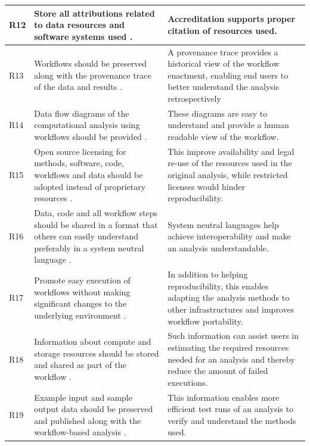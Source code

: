 \documentclass[a4paper,num-refs]{oup-contemporary}
\begin{document}
\begin{table}[!htbp]
\begin{tabularx}{\linewidth}{p{1.4cm} L L}
R12 \newline{} & Store all attributions related to data resources and software systems used \citep{garijo_2017, Stodden2014}. & Accreditation supports proper citation of resources used.  \\  \midrule
R13 \newline{} & Workflows should be preserved along with the provenance trace of the data and results \citep{belhajjame_2015, belhajjame_2012, garijo_2017, sandve_2013, Stodden2014}. &   A provenance trace provides a historical view of the workflow enactment, enabling end users to better understand the analysis retrospectively  \\  \midrule
R14 \newline{} & Data flow diagrams of the computational analysis using workflows should be provided \citep{kanwal_2017, garijo_2013}. &  These diagrams are easy to understand and provide a human readable view of the workflow.   \\  \midrule
R15 \newline{} & Open source licensing for methods, software, code, workflows and data should be adopted instead of proprietary resources \citep{kanwal_2017, garijo_2013, sandve_2013, stodden_2016, Stodden2014, Gymrek2016}. & This improve availability and legal re-use of the resources used in the original analysis, while restricted licenses would hinder reproducibility. \\  \midrule
R16 \newline{} & Data, code and all workflow steps should be shared in a format that others can easily understand preferably in a system neutral language \citep{belhajjame_2015, garijo_2013, Gymrek2016}.  &  System neutral languages  help achieve interoperability and make an analysis understandable.  \\  \midrule
R17 \newline{} & Promote easy execution of workflows without making significant changes to the underlying environment \citep{Spjuth2015}. & In addition to helping reproducibility, this enables adapting the analysis methods to other infrastructures and improves workflow portability.  \\  \midrule
R18 \newline{} & Information about compute and storage resources should be stored and shared as part of the workflow \citep{kanwal_2017}.  &  Such information can assist users in estimating the required resources needed for an analysis and thereby reduce the amount of failed executions. \\  \midrule
R19 \newline{} & Example input and sample output data should be preserved and published along with the workflow-based analysis \citep{belhajjame_2015, Zhao2012}. &   This information enables more efficient test runs of an analysis to verify and understand the methods used.  \\  \midrule
\bottomrule
\end{tabularx}


\end{table}
\end{document}

